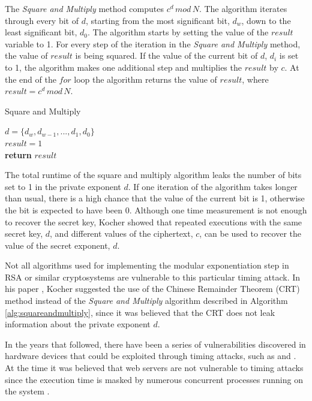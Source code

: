 \documentclass[10pt,a4paper,twoside]{book}
\begin{document}
The \textit{Square and Multiply} method computes $c^d \, mod \, N$. The algorithm iterates through every bit of $d$, starting from the most significant bit, $d_w$, down to the least significant bit, $d_0$. The algorithm starts by setting the value of the $result$ variable to 1. For every step of the iteration in the \textit{Square and Multiply} method, the value of $result$ is being squared. If the value of the current bit of $d$, $d_i$ is set to 1, the algorithm makes one additional step and multiplies the $result$ by $c$. At the end of the $for$ loop the algorithm returns the value of $result$, where $result = c^d \, mod \, N$.

\begin{algorithm}
\caption{Square and Multiply \cite{menezes1996handbook}}
\label{alg:squareandmultiply}
$d = \{d_w, d_{w-1}, ..., d_1, d_0\}$\\
$result = 1$\\
{\bf return} $result$
\end{algorithm}

The total runtime of the square and multiply algorithm leaks the number of bits set to 1 in the private exponent $d$. If one iteration of the algorithm takes longer than usual, there is a high chance that the value of the current bit is 1, otherwise the bit is expected to have been 0. Although one time measurement is not enough to recover the secret key, Kocher\cite{kocc2009cryptographic} showed that repeated executions with the same secret key, $d$, and different values of the ciphertext, $c$, can be used to recover the value of the secret exponent, $d$.

Not all algorithms used for implementing the modular exponentiation step in RSA or similar cryptosystems are vulnerable to this particular timing attack. In his paper \cite{kocher1996timing}, Kocher suggested the use of the Chinese Remainder Theorem (CRT) method instead of the \textit{Square and Multiply} algorithm described in Algorithm \ref{alg:squareandmultiply}, since it was believed that the CRT does not leak information about the private exponent $d$.

In the years that followed, there have been a series of vulnerabilities discovered in hardware devices that could be exploited through timing attacks, such as \cite{dhem1998practical} and \cite{schindler2000timing}. At the time it was believed that web servers are not vulnerable to timing attacks since the execution time is masked by numerous concurrent processes running on the system \cite{brumley2005remote}.
\end{document}
